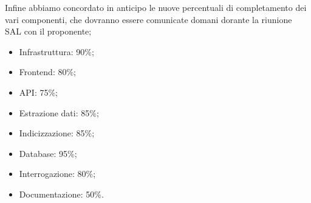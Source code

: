 Infine abbiamo concordato in anticipo le nuove percentuali di completamento dei vari componenti, che dovranno essere comunicate domani dorante la riunione SAL con il proponente;
\begin{itemize}
    \item Infrastruttura: 90\%;
    \item Frontend: 80\%;
    \item API: 75\%;
    \item Estrazione dati: 85\%;
    \item Indicizzazione: 85\%;
    \item Database: 95\%;
    \item Interrogazione: 80\%;
    \item Documentazione: 50\%.
\end{itemize}